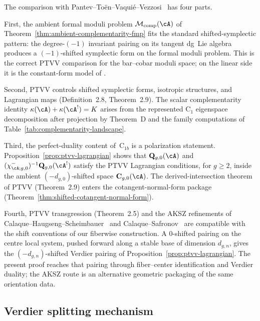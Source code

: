 \begin{remark}
The comparison with
Pantev--To\"en--Vaqui\'e--Vezzosi~\cite{PTVV13}
has four parts.

First, the ambient formal moduli problem
$\mathcal{M}_{\mathrm{comp}}(\cA)$ of
Theorem~\ref{thm:ambient-complementarity-fmp} fits the standard
shifted-symplectic pattern: the degree-$(-1)$ invariant pairing on its
tangent dg~Lie algebra produces a $(-1)$-shifted symplectic form on the
formal moduli problem. This is the correct PTVV comparison for the
bar--cobar moduli space; on the linear side it is the constant-form
model of \cite[Example~1.4]{PTVV13}.

Second, PTVV controls shifted symplectic forms, isotropic structures,
and Lagrangian maps
\textup{(}Definition~\textup{2.8}, Theorem~\textup{2.9}\textup{)}.
The scalar complementarity identity
$\kappa(\cA)+\kappa(\cA^!)=K$ arises from the represented
$\mathrm C_1$ eigenspace decomposition after projection by Theorem~D
and the family computations of
Table~\ref{tab:complementarity-landscape}.

Third, the perfect-duality content of~$\mathrm{C}_{1b}$ is a
polarization statement. Proposition~\ref{prop:ptvv-lagrangian} shows
that $\mathbf{Q}_{g,0}(\cA)$ and
$(\chi^-_{\cA;g,0})^{-1}\mathbf{Q}_{g,0}(\cA^!)$ satisfy the PTVV
Lagrangian conditions, for $g\geq2$, inside the ambient
$(-d_{g,0})$-shifted space $\mathbf{C}_{g,0}(\cA)$.
The derived-intersection theorem of PTVV
\textup{(}Theorem~\textup{2.9}\textup{)} enters the
cotangent-normal-form package
\textup{(}Theorem~\textup{\ref{thm:shifted-cotangent-normal-form}}\textup{)}.

Fourth, PTVV transgression
\textup{(}Theorem~\textup{2.5}\textup{)} and the AKSZ refinements of
Calaque--Haugseng--Scheimbauer~\cite{CHS25} and
Calaque--Safronov~\cite{CS24} are compatible with the shift conventions
of our fiberwise construction.  A $0$-shifted pairing on the centre
local system, pushed forward along a stable base of dimension
$d_{g,n}$, gives the $(-d_{g,n})$-shifted Verdier pairing of
Proposition~\ref{prop:ptvv-lagrangian}. The present proof reaches that
pairing through fiber--center identification and Verdier duality; the
AKSZ route is an alternative geometric packaging of the same
orientation data.
\end{remark}

\subsection{Verdier splitting mechanism}

